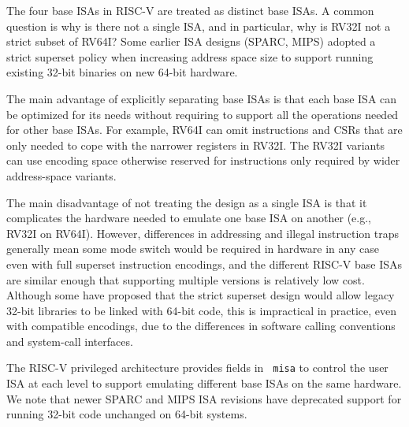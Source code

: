 \begin{commentary}
The four base ISAs in RISC-V are treated as distinct base ISAs.  A
common question is why is there not a single ISA, and in particular,
why is RV32I not a strict subset of RV64I?  Some earlier ISA designs
(SPARC, MIPS) adopted a strict superset policy when increasing address
space size to support running existing 32-bit binaries on new 64-bit
hardware.

The main advantage of explicitly separating base ISAs is that each
base ISA can be optimized for its needs without requiring to support
all the operations needed for other base ISAs.  For example, RV64I can
omit instructions and CSRs that are only needed to cope with the
narrower registers in RV32I.  The RV32I variants can use encoding
space otherwise reserved for instructions only required by wider
address-space variants.

The main disadvantage of not treating the design as a single ISA is
that it complicates the hardware needed to emulate one base ISA on
another (e.g., RV32I on RV64I).  However, differences in addressing
and illegal instruction traps generally mean some mode switch would be
required in hardware in any case even with full superset instruction
encodings, and the different RISC-V base ISAs are similar enough that
supporting multiple versions is relatively low cost.  Although some
have proposed that the strict superset design would allow legacy
32-bit libraries to be linked with 64-bit code, this is impractical in
practice, even with compatible encodings, due to the differences in
software calling conventions and system-call interfaces.

The RISC-V privileged architecture provides fields in {\tt
  misa} to control the user ISA at each level to support emulating
different base ISAs on the same hardware.  We note that newer SPARC
and MIPS ISA revisions have deprecated support for running 32-bit code
unchanged on 64-bit systems.


\end{commentary}
